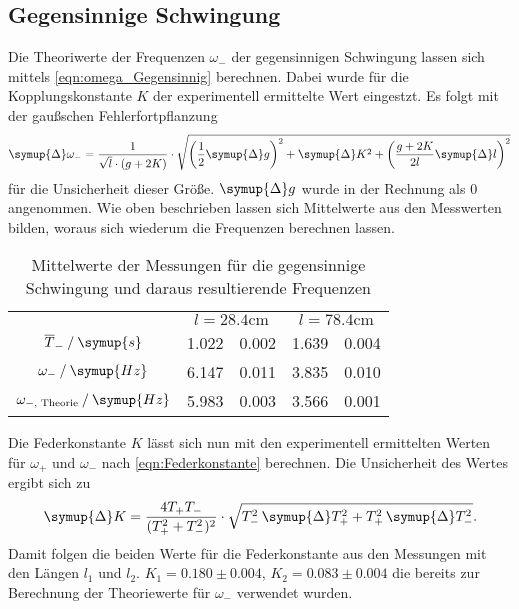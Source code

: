 \subsection{Gegensinnige Schwingung}
\label{subsec:Gegensinnig}
Die Theoriwerte der Frequenzen $\omega_-$ der gegensinnigen Schwingung lassen sich mittels \autoref{eqn:omega_Gegensinnig} berechnen. Dabei wurde für die Kopplungskonstante $K$ 
der experimentell ermittelte Wert eingestzt. Es folgt mit der gaußschen Fehlerfortpflanzung
\begin{equation}
    \label{eqn:DeltaOmegaMinus}
    \symup{\Delta}\omega_- = \frac{1}{\sqrt{l} \cdot (g + 2K)} \cdot \sqrt{\left(\frac{1}{2}\symup{\Delta}g\right)^2 + \symup{\Delta}K^2 + \left(\frac{g+2K}{2l}\symup{\Delta}l\right)^2}
\end{equation}
für die Unsicherheit dieser Größe. $\symup{\Delta}g$ wurde in der Rechnung als $0$ angenommen. Wie oben beschrieben lassen sich Mittelwerte aus den Messwerten bilden,
woraus sich wiederum die Frequenzen berechnen lassen. 

\begin{table}
    \centering
    \caption{Mittelwerte der Messungen für die gegensinnige Schwingung und daraus resultierende Frequenzen}
    \begin{tabular}{c S @{${}\pm{}$} S S @{${}\pm{}$} S}
    \toprule
    &  &  \\
    \cmidrule(lr){2-3}\cmidrule(lr){4-5}
    {$\overline{T}_- \mathbin{/} \symup{s}$}                & 1.022 & 0.002 & 1.639 & 0.004 \\
    {$\omega_- \mathbin{/} \symup{Hz}$}                     & 6.147 & 0.011 & 3.835 & 0.010 \\
    {$\omega_{{-}\text{, Theorie}} \mathbin{/} \symup{Hz}$} & 5.983 & 0.003 & 3.566 & 0.001 \\
    \bottomrule
    \end{tabular}
\end{table}
Die Federkonstante $K$ lässt sich nun mit den experimentell ermittelten Werten für $\omega_+$ und $\omega_-$ nach \autoref{eqn:Federkonstante} berechnen.
Die Unsicherheit des Wertes ergibt sich zu
\begin{equation}
    \label{eqn:DeltaK}
    \symup{\Delta}K = \frac{4T_+T_-}{(T_+^2 + T_-^2)^2} \cdot \sqrt{T_-^2 \, \symup{\Delta}T_+^2 + T_+^2 \, \symup{\Delta}T_-^2}.
\end{equation}
Damit folgen die beiden Werte für die Federkonstante aus den Messungen mit den Längen $l_1$ und $l_2$. $K_1 = 0.180 \pm 0.004$, $K_2 = 0.083 \pm 0.004$
die bereits zur Berechnung der Theoriewerte für $\omega_-$ verwendet wurden.

